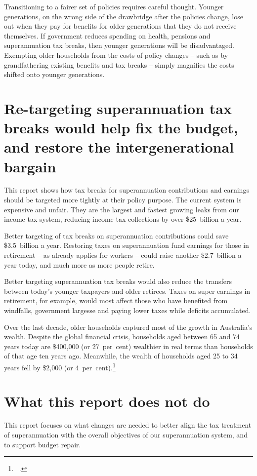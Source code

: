 Transitioning to a fairer set of policies requires careful thought. Younger generations, on the wrong side of the drawbridge after the policies change, lose out when they pay for benefits for older generations that they do not receive themselves. If government reduces spending on health, pensions and superannuation tax breaks, then younger generations will be disadvantaged. Exempting older households from the costs of policy changes – such as by grandfathering existing benefits and tax breaks – simply magnifies the costs shifted onto younger generations. 

\section{Re-targeting superannuation tax breaks would help fix the budget, and restore the intergenerational bargain}
This report shows how tax breaks for superannuation contributions and earnings should be targeted more tightly at their policy purpose. The current system is expensive and unfair. They are the largest and fastest growing leaks from our income tax system, reducing income tax collections by over \$25~billion a year. 

Better targeting of tax breaks on superannuation contributions could save \$3.5~billion a year. Restoring taxes on superannuation fund earnings for those in retirement – as already applies for workers – could raise another \$2.7~billion a year today, and much more as more people retire. 

Better targeting superannuation tax breaks would also reduce the transfers between today’s younger taxpayers and older retirees. Taxes on super earnings in retirement, for example, would most affect those who have benefited from windfalls, government largesse and paying lower taxes while deficits accumulated.

Over the last decade, older households captured most of the growth in Australia’s wealth. Despite the global financial crisis, households aged between 65 and 74 years today are \$400,000 (or 27~per~cent) wealthier in real terms than households of that age ten years ago. Meanwhile, the wealth of households aged 25 to 34 years fell by \$2,000 (or 4~per~cent).\footnote{\gao\ \textcites{ABS2015HouseholdIncomeWealth1314}{ABS2006HES0304}.}

\section{What this report does not do}\label{sec:SUPER-what-this-report-does-not-do}
This report focuses on what changes are needed to better align the tax treatment of superannuation with the overall objectives of our superannuation system, and to support budget repair. 

